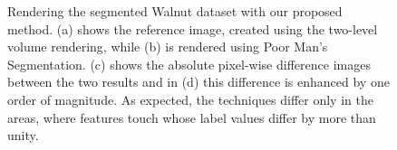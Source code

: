 \documentclass{egpubl}
\begin{document}
\begin{figure}
{		\label{fig:result2:pms}
	}
	\caption{Rendering the segmented Walnut dataset with our proposed method. (a) shows the reference image, created using the two-level volume rendering, while (b) is rendered using Poor Man's Segmentation. (c) shows the absolute pixel-wise difference images between the two results and in (d) this difference is enhanced by one order of magnitude. As expected, the techniques differ only in the areas, where features touch whose label values differ by more than unity.}
\end{figure}
\end{document}
